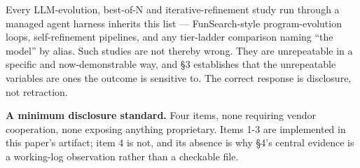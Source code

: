 \documentclass[11pt]{article}
\begin{document}
Every LLM-evolution, best-of-N and iterative-refinement study run through a managed
agent harness inherits this list --- FunSearch-style program-evolution loops,
self-refinement pipelines, and any tier-ladder comparison naming ``the model'' by alias.
Such studies are not thereby wrong. They are unrepeatable in a specific and
now-demonstrable way, and \S3 establishes that the unrepeatable variables are ones the
outcome is sensitive to. The correct response is disclosure, not retraction.

\textbf{A minimum disclosure standard.} Four items, none requiring vendor cooperation, none
exposing anything proprietary. Items 1-3 are implemented in this paper's artifact; item 4
is not, and its absence is why \S4's central evidence is a working-log observation rather
than a checkable file.
\end{document}
